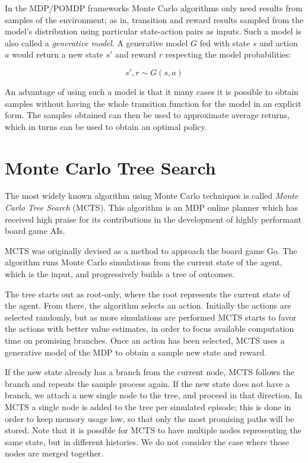 In the MDP/POMDP frameworks Monte Carlo algorithms only need results from samples of the
environment; as in, transition and reward results sampled from the model's distribution using
particular state-action pairs as inputs. Such a model is also called a \textit{generative model}. A
generative model $G$ fed with state $s$ and action $a$ would return a new state $s'$ and reward $r$
respecting the model probabilities:

\[ s', r \sim G(s, a) \]

An advantage of using such a model is that it many cases it is possible to obtain samples without
having the whole transition function for the model in an explicit form. The samples obtained can
then be used to approximate average returns, which in turns can be used to obtain an optimal policy.

\section{Monte Carlo Tree Search}

The most widely known algorithm using Monte Carlo techniques is called \textit{Monte Carlo Tree
Search} (MCTS). This algorithm is an MDP online planner which has received high praise for its
contributions in the development of highly performant board game AIs.

MCTS was originally devised as a method to approach the board game Go. The algorithm runs Monte
Carlo simulations from the current state of the agent, which is the input, and progressively builds
a tree of outcomes.

The tree starts out as root-only, where the root represents the current state of the agent. From
there, the algorithm selects an action. Initially the actions are selected randomly, but as more
simulations are performed MCTS starts to favor the actions with better value estimates, in order to
focus available computation time on promising branches. Once an action has been selected, MCTS uses
a generative model of the MDP to obtain a sample new state and reward.

If the new state already has a branch from the current node, MCTS follows the branch and repeats the
sample process again. If the new state does not have a branch, we attach a new single node to the
tree, and proceed in that direction. In MCTS a single node is added to the tree per simulated
episode; this is done in order to keep memory usage low, so that only the most promising paths will
be stored. Note that it is possible for MCTS to have multiple nodes representing the same state, but
in different histories. We do not consider the case where those nodes are merged together.

